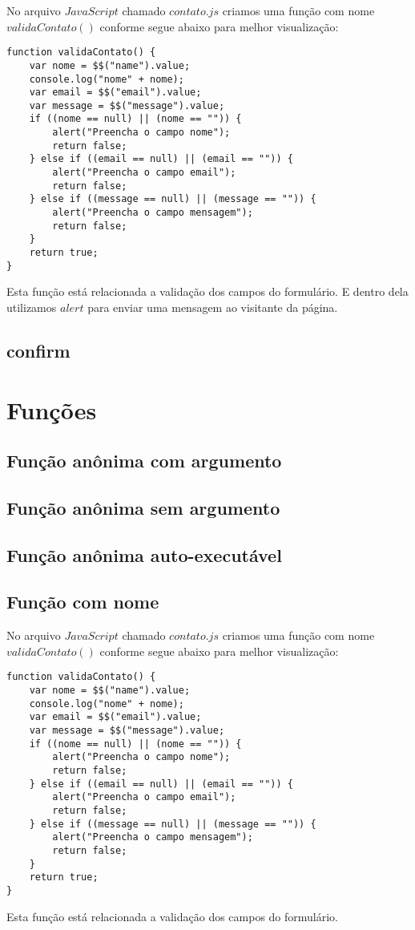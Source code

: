 	No arquivo $JavaScript$ chamado $contato.js$ criamos uma função com nome $validaContato()$ conforme segue abaixo para melhor visualização:
\begin{lstlisting}
function validaContato() {
    var nome = $$("name").value;
    console.log("nome" + nome);
    var email = $$("email").value;
    var message = $$("message").value;
    if ((nome == null) || (nome == "")) {
        alert("Preencha o campo nome");
        return false;
    } else if ((email == null) || (email == "")) {
        alert("Preencha o campo email");
        return false;
    } else if ((message == null) || (message == "")) {
        alert("Preencha o campo mensagem");
        return false;
    }
    return true;
}
\end{lstlisting}
	Esta função está relacionada a validação dos campos do formulário. E dentro dela utilizamos $alert$ para enviar uma mensagem ao visitante da página.

\subsection{confirm}

\section{Funções}
\subsection{Função anônima com argumento}

\subsection{Função anônima sem argumento}

\subsection{Função anônima auto-executável}

\subsection{Função com nome}

	No arquivo $JavaScript$ chamado $contato.js$ criamos uma função com nome $validaContato()$ conforme segue abaixo para melhor visualização:
\begin{lstlisting}
function validaContato() {
    var nome = $$("name").value;
    console.log("nome" + nome);
    var email = $$("email").value;
    var message = $$("message").value;
    if ((nome == null) || (nome == "")) {
        alert("Preencha o campo nome");
        return false;
    } else if ((email == null) || (email == "")) {
        alert("Preencha o campo email");
        return false;
    } else if ((message == null) || (message == "")) {
        alert("Preencha o campo mensagem");
        return false;
    }
    return true;
}
\end{lstlisting}
	Esta função está relacionada a validação dos campos do formulário.

